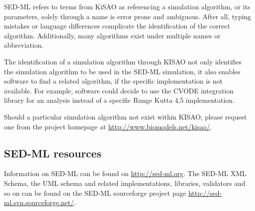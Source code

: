 SED-ML refers to terms from KiSAO as referencing a simulation algorithm, 
or its parameters, solely through a name is error prone and ambiguous. 
After all, typing mistakes or language differences complicate the 
identification of the correct algorithm. Additionally, many algorithms 
exist under multiple names or abbreviation. 

The identification of a simulation algorithm through KISAO not only 
identifies the simulation algorithm to be used in the SED-ML simulation, 
it also enables software to find a related algorithm, if the specific 
implementation is not available. For example, software could decide to 
use the CVODE integration library for an analysis instead of a specific 
Runge Kutta 4,5 implementation. 

Should a particular simulation algorithm not exist within KISAO, please 
request one from the project homepage at 
\url{http://www.biomodels.net/kisao/}.

\subsection{SED-ML resources}
\label{sec:resources}

Information on SED-ML can be found on \url{http://sed-ml.org}. The SED-ML XML Schema, the UML schema and related implementations, libraries, validators and so on can be found on the SED-ML sourceforge project page \url{http://sed-ml.svn.sourceforge.net/}.

